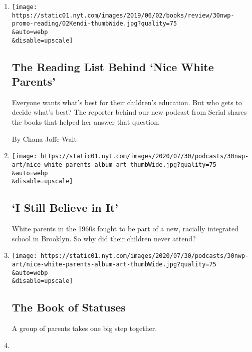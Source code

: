 \begin{enumerate}
\def\labelenumi{\arabic{enumi}.}
\item
  \href{/2020/07/30/podcasts/nice-white-parents-reading-list.html}{}

  \texttt{[image: https://static01.nyt.com/images/2019/06/02/books/review/30nwp-promo-reading/02Kendi-thumbWide.jpg?quality=75\\\&auto=webp\\\&disable=upscale]}

  \hypertarget{the-reading-list-behind-nice-white-parents}{%
  \subsection{The Reading List Behind `Nice White
  Parents'}\label{the-reading-list-behind-nice-white-parents}}

  Everyone wants what's best for their children's education. But who
  gets to decide what's best? The reporter behind our new podcast from
  Serial shares the books that helped her answer that question.

  By Chana Joffe-Walt
\item
  \href{/2020/07/30/podcasts/nice-white-parents-serial-2.html}{}

  \texttt{[image: https://static01.nyt.com/images/2020/07/30/podcasts/30nwp-art/nice-white-parents-album-art-thumbWide.jpg?quality=75\\\&auto=webp\\\&disable=upscale]}

  \hypertarget{i-still-believe-in-it}{%
  \subsection{`I Still Believe in It'}\label{i-still-believe-in-it}}

  White parents in the 1960s fought to be part of a new, racially
  integrated school in Brooklyn. So why did their children never attend?
\item
  \href{/2020/07/30/podcasts/nice-white-parents-serial.html}{}

  \texttt{[image: https://static01.nyt.com/images/2020/07/30/podcasts/30nwp-art/nice-white-parents-album-art-thumbWide.jpg?quality=75\\\&auto=webp\\\&disable=upscale]}

  \hypertarget{the-book-of-statuses}{%
  \subsection{The Book of Statuses}\label{the-book-of-statuses}}

  A group of parents takes one big step together.
\item
  \href{/2020/07/24/podcasts/daily-newsletter-schools-reopening-summer-playlist.html}{}


\end{enumerate}
